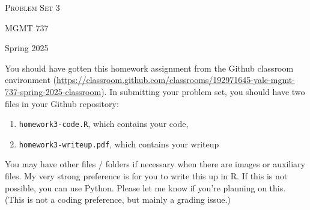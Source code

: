 \documentclass[11pt, a4paper]{article}
\begin{document}
\begin{center}
  {\Large \textsc{Problem Set 3}}

  MGMT 737
\end{center}
\begin{center}
  Spring 2025
\end{center}

You should have gotten this homework assignment from the Github classroom environment (\url{https://classroom.github.com/classrooms/192971645-yale-mgmt-737-spring-2025-classroom}). In submitting your problem set, you should have two files in your Github repository:


\begin{enumerate}
  \item \texttt{homework3-code.R}, which contains your code,
  \item \texttt{homework3-writeup.pdf}, which contains your writeup 
\end{enumerate} 

You may have other files / folders if necessary when there are images or auxiliary files. My very strong preference is for you to write this up in R. If this is not possible, you can use Python. Please let me know if you're planning on this. (This is not a coding preference, but mainly a grading issue.)
\end{document}
